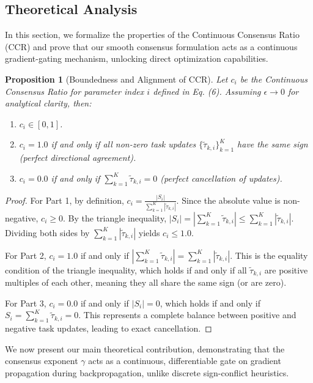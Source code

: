 \documentclass{article}
\theoremstyle{plain}
\newtheorem{proposition}[theorem]{Proposition}
\theoremstyle{definition}
\theoremstyle{remark}
\begin{document}
\subsection{Theoretical Analysis}
In this section, we formalize the properties of the Continuous Consensus Ratio (CCR) and prove that our smooth consensus formulation acts as a continuous gradient-gating mechanism, unlocking direct optimization capabilities.

\begin{proposition}[Boundedness and Alignment of CCR]
Let $c_i$ be the Continuous Consensus Ratio for parameter index $i$ defined in Eq. (6). Assuming $\epsilon \to 0$ for analytical clarity, then:
\begin{enumerate}
    \item $c_i \in [0, 1]$.
    \item $c_i = 1.0$ if and only if all non-zero task updates $\{\tilde{\tau}_{k, i}\}_{k=1}^K$ have the same sign (perfect directional agreement).
    \item $c_i = 0.0$ if and only if $\sum_{k=1}^K \tilde{\tau}_{k, i} = 0$ (perfect cancellation of updates).
\end{enumerate}
\end{proposition}

\begin{proof}
For Part 1, by definition, $c_i = \frac{|S_i|}{\sum_{k=1}^K |\tilde{\tau}_{k, i}|}$. Since the absolute value is non-negative, $c_i \ge 0$. By the triangle inequality, $|S_i| = \left| \sum_{k=1}^K \tilde{\tau}_{k, i} \right| \le \sum_{k=1}^K |\tilde{\tau}_{k, i}|$. Dividing both sides by $\sum_{k=1}^K |\tilde{\tau}_{k, i}|$ yields $c_i \le 1.0$.

For Part 2, $c_i = 1.0$ if and only if $\left| \sum_{k=1}^K \tilde{\tau}_{k, i} \right| = \sum_{k=1}^K |\tilde{\tau}_{k, i}|$. This is the equality condition of the triangle inequality, which holds if and only if all $\tilde{\tau}_{k, i}$ are positive multiples of each other, meaning they all share the same sign (or are zero).

For Part 3, $c_i = 0.0$ if and only if $|S_i| = 0$, which holds if and only if $S_i = \sum_{k=1}^K \tilde{\tau}_{k, i} = 0$. This represents a complete balance between positive and negative task updates, leading to exact cancellation.
\end{proof}

We now present our main theoretical contribution, demonstrating that the consensus exponent $\gamma$ acts as a continuous, differentiable gate on gradient propagation during backpropagation, unlike discrete sign-conflict heuristics.
\end{document}
